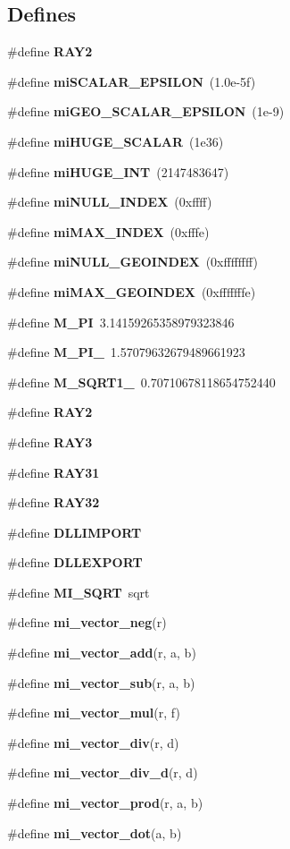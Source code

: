 \subsection*{Defines}
\begin{CompactItemize}
\item 
\#define {\bf RAY2}
\item 
\#define {\bf mi\-SCALAR\_\-EPSILON}\ (1.0e-5f)
\item 
\#define {\bf mi\-GEO\_\-SCALAR\_\-EPSILON}\ (1e-9)
\item 
\#define {\bf mi\-HUGE\_\-SCALAR}\ (1e36)
\item 
\#define {\bf mi\-HUGE\_\-INT}\ (2147483647)
\item 
\#define {\bf mi\-NULL\_\-INDEX}\ (0xffff)
\item 
\#define {\bf mi\-MAX\_\-INDEX}\ (0xfffe)
\item 
\#define {\bf mi\-NULL\_\-GEOINDEX}\ (0xffffffff)
\item 
\#define {\bf mi\-MAX\_\-GEOINDEX}\ (0xfffffffe)
\item 
\#define {\bf M\_\-PI}\ 3.14159265358979323846
\item 
\#define {\bf M\_\-PI\_}\ 1.57079632679489661923
\item 
\#define {\bf M\_\-SQRT1\_}\ 0.70710678118654752440
\item 
\#define {\bf RAY2}
\item 
\#define {\bf RAY3}
\item 
\#define {\bf RAY31}
\item 
\#define {\bf RAY32}
\item 
\#define {\bf DLLIMPORT}
\item 
\#define {\bf DLLEXPORT}
\item 
\#define {\bf MI\_\-SQRT}\ sqrt
\item 
\#define {\bf mi\_\-vector\_\-neg}(r)
\item 
\#define {\bf mi\_\-vector\_\-add}(r, a, b)
\item 
\#define {\bf mi\_\-vector\_\-sub}(r, a, b)
\item 
\#define {\bf mi\_\-vector\_\-mul}(r, f)
\item 
\#define {\bf mi\_\-vector\_\-div}(r, d)
\item 
\#define {\bf mi\_\-vector\_\-div\_\-d}(r, d)
\item 
\#define {\bf mi\_\-vector\_\-prod}(r, a, b)
\item 
\#define {\bf mi\_\-vector\_\-dot}(a, b)
\item 

\end{CompactItemize}

